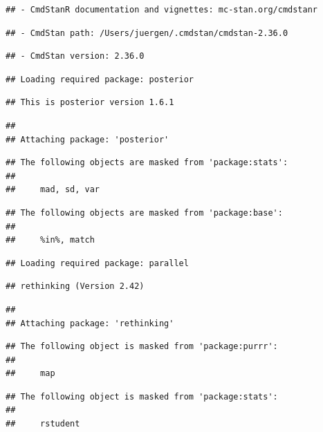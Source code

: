 \documentclass[
]{book}
\begin{document}
\begin{verbatim}
## - CmdStanR documentation and vignettes: mc-stan.org/cmdstanr
\end{verbatim}

\begin{verbatim}
## - CmdStan path: /Users/juergen/.cmdstan/cmdstan-2.36.0
\end{verbatim}

\begin{verbatim}
## - CmdStan version: 2.36.0
\end{verbatim}

\begin{verbatim}
## Loading required package: posterior
\end{verbatim}

\begin{verbatim}
## This is posterior version 1.6.1
\end{verbatim}

\begin{verbatim}
## 
## Attaching package: 'posterior'
\end{verbatim}

\begin{verbatim}
## The following objects are masked from 'package:stats':
## 
##     mad, sd, var
\end{verbatim}

\begin{verbatim}
## The following objects are masked from 'package:base':
## 
##     %in%, match
\end{verbatim}

\begin{verbatim}
## Loading required package: parallel
\end{verbatim}

\begin{verbatim}
## rethinking (Version 2.42)
\end{verbatim}

\begin{verbatim}
## 
## Attaching package: 'rethinking'
\end{verbatim}

\begin{verbatim}
## The following object is masked from 'package:purrr':
## 
##     map
\end{verbatim}

\begin{verbatim}
## The following object is masked from 'package:stats':
## 
##     rstudent
\end{verbatim}
\end{document}
